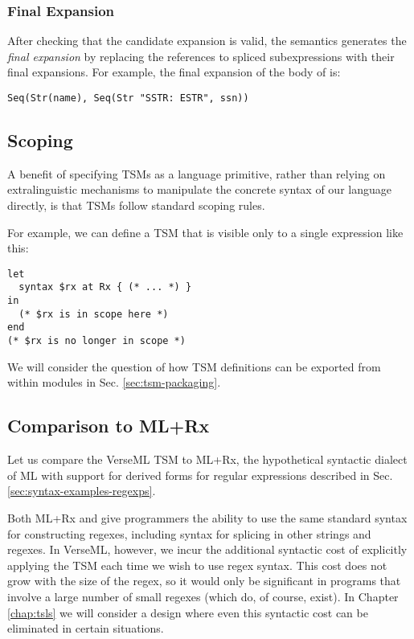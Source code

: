 \subsubsection{Final Expansion}
After checking that the candidate expansion is {valid}, the semantics generates the \emph{final expansion} by replacing the references to spliced subexpressions with their final expansions. For example, the final expansion of the body of  is:
\begin{lstlisting}[numbers=none]
Seq(Str(name), Seq(Str "SSTR: ESTR", ssn))
\end{lstlisting}

\subsection{Scoping}
A benefit of specifying TSMs as a language primitive, rather than relying on extralinguistic mechanisms to manipulate the concrete syntax of our language directly, is that TSMs follow standard scoping rules. 

For example, we can define a TSM that is visible only to a single expression like this:
\begin{lstlisting}[numbers=none]
let
  syntax $rx at Rx { (* ... *) }
in 
  (* $rx is in scope here *)
end
(* $rx is no longer in scope *)
\end{lstlisting}

We will consider the question of how TSM definitions can be exported from within modules in Sec. \ref{sec:tsm-packaging}.

\subsection{Comparison to ML+Rx}
Let us compare the VerseML TSM  to ML+Rx, the hypothetical syntactic dialect of ML with support for derived forms for regular expressions described in Sec. \ref{sec:syntax-examples-regexps}.

Both ML+Rx and  give programmers the ability to use the same standard syntax for constructing regexes, including syntax for splicing in other strings and regexes. In VerseML, however, we incur the additional syntactic cost of explicitly applying the  TSM each time we wish to use regex syntax. This cost does not grow with the size of the regex, so it would only be significant in programs that involve a large number of small regexes (which do, of course, exist). In Chapter \ref{chap:tsls} we will consider a design where even this syntactic cost can be eliminated in certain situations.

